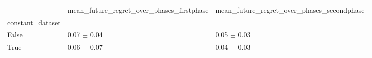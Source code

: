 \begin{tabular}{lll}
\toprule
 & mean_future_regret_over_phases_firstphase & mean_future_regret_over_phases_secondphase \\
constant_dataset &  &  \\
\midrule
False & 0.07 $\pm$ 0.04 & 0.05 $\pm$ 0.03 \\
True & 0.06 $\pm$ 0.07 & 0.04 $\pm$ 0.03 \\
\bottomrule
\end{tabular}
